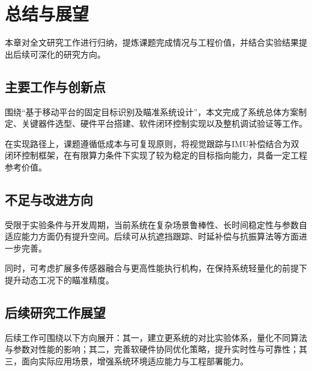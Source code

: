 \chapter{总结与展望}

本章对全文研究工作进行归纳，提炼课题完成情况与工程价值，并结合实验结果提出后续可深化的研究方向。

\section{主要工作与创新点}

围绕“基于移动平台的固定目标识别及瞄准系统设计”，本文完成了系统总体方案制定、关键器件选型、硬件平台搭建、软件闭环控制实现以及整机调试验证等工作。

在实现路径上，课题遵循低成本与可复现原则，将视觉跟踪与IMU补偿结合为双闭环控制框架，在有限算力条件下实现了较为稳定的目标指向能力，具备一定工程参考价值。

\section{不足与改进方向}

受限于实验条件与开发周期，当前系统在复杂场景鲁棒性、长时间稳定性与参数自适应能力方面仍有提升空间。后续可从抗遮挡跟踪、时延补偿与抗振算法等方面进一步完善。

同时，可考虑扩展多传感器融合与更高性能执行机构，在保持系统轻量化的前提下提升动态工况下的瞄准精度。

\section{后续研究工作展望}

后续工作可围绕以下方向展开：其一，建立更系统的对比实验体系，量化不同算法与参数对性能的影响；其二，完善软硬件协同优化策略，提升实时性与可靠性；其三，面向实际应用场景，增强系统环境适应能力与工程部署能力。

\newpage\quad %

